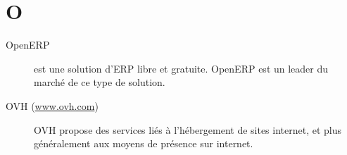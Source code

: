 \section{O}

\begin{description}

\item[OpenERP] est une solution d'ERP libre et gratuite. OpenERP est un leader
du marché de ce type de solution.

\item[OVH (\url{www.ovh.com})]
OVH propose des services liés à l'hébergement de sites internet, et plus généralement aux moyens de présence sur internet. 

\end{description}
